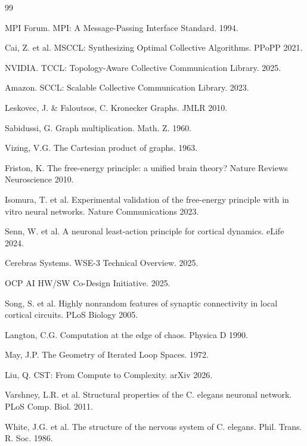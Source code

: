 \documentclass[12pt]{article}
\begin{document}

\begin{thebibliography}{99}

 MPI Forum. MPI: A Message-Passing Interface Standard. 1994.

 Cai, Z. et al. MSCCL: Synthesizing Optimal Collective
Algorithms. PPoPP 2021.

 NVIDIA. TCCL: Topology-Aware Collective Communication
Library. 2025.

 Amazon. SCCL: Scalable Collective Communication Library. 2023.

 Leskovec, J. \& Faloutsos, C. Kronecker Graphs.
JMLR 2010.

 Sabidussi, G. Graph multiplication. Math. Z. 1960.

 Vizing, V.G. The Cartesian product of graphs. 1963.

 Friston, K. The free-energy principle: a unified
brain theory? Nature Reviews Neuroscience 2010.

 Isomura, T. et al. Experimental validation of the
free-energy principle with in vitro neural networks. Nature
Communications 2023.

 Senn, W. et al. A neuronal least-action principle for
cortical dynamics. eLife 2024.

 Cerebras Systems. WSE-3 Technical Overview. 2025.

 OCP AI HW/SW Co-Design Initiative. 2025.

 Song, S. et al. Highly nonrandom features of synaptic
connectivity in local cortical circuits. PLoS Biology 2005.

 Langton, C.G. Computation at the edge of chaos.
Physica D 1990.

 May, J.P. The Geometry of Iterated Loop Spaces. 1972.

 Liu, Q. CST: From Compute to Complexity. arXiv 2026.

 Varshney, L.R. et al. Structural properties of the
C. elegans neuronal network. PLoS Comp. Biol. 2011.

 White, J.G. et al. The structure of the nervous system
of C. elegans. Phil. Trans. R. Soc. 1986.

\end{thebibliography}
\end{document}
